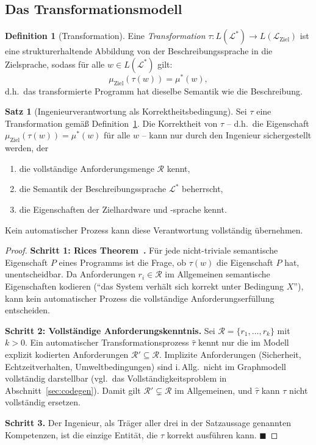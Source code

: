 ﻿\documentclass[a4paper,12pt]{report}
\theoremstyle{definition}
\newtheorem{definition}{Definition}[section]
\newtheorem{satz}{Satz}[section]
\begin{document}
\subsection{Das Transformationsmodell}

\begin{definition}[Transformation]
\label{def:transformation}
Eine \emph{Transformation} $\tau: L(\mathcal{L}^*) \to L(\mathcal{L}_{\text{Ziel}})$
ist eine strukturerhaltende Abbildung von der Beschreibungssprache in die Zielsprache,
sodass für alle $w \in L(\mathcal{L}^*)$ gilt:
\[
  \mu_{\text{Ziel}}(\tau(w)) = \mu^*(w),
\]
d.h.\ das transformierte Programm hat dieselbe Semantik wie die Beschreibung.
\end{definition}

\begin{satz}[Ingenieurverantwortung als Korrektheitsbedingung]
\label{satz:ingverantwortung}
Sei $\tau$ eine Transformation gemäß Definition~\ref{def:transformation}.
Die Korrektheit von $\tau$ -- d.h.\ die Eigenschaft $\mu_{\text{Ziel}}(\tau(w)) = \mu^*(w)$
für alle $w$ -- kann nur durch den Ingenieur sichergestellt werden, der
\begin{enumerate}
  \item die vollständige Anforderungsmenge $\mathcal{R}$ kennt,
  \item die Semantik der Beschreibungssprache $\mathcal{L}^*$ beherrscht,
  \item die Eigenschaften der Zielhardware und -sprache kennt.
\end{enumerate}
Kein automatischer Prozess kann diese Verantwortung vollständig übernehmen.
\end{satz}

\begin{proof}
\textbf{Schritt 1: Rices Theorem~\cite{rice1953}.}
Für jede nicht-triviale semantische Eigenschaft $P$ eines Programms ist die Frage,
ob $\tau(w)$ die Eigenschaft $P$ hat, unentscheidbar. Da Anforderungen
$r_i \in \mathcal{R}$ im Allgemeinen semantische Eigenschaften kodieren
(\enquote{das System verhält sich korrekt unter Bedingung $X$}), kann kein
automatischer Prozess die vollständige Anforderungserfüllung entscheiden.

\textbf{Schritt 2: Vollständige Anforderungskenntnis.}
Sei $\mathcal{R} = \{r_1, \ldots, r_k\}$ mit $k > 0$.
Ein automatischer Transformationsprozess $\hat{\tau}$ kennt nur die im Modell
explizit kodierten Anforderungen $\mathcal{R}' \subseteq \mathcal{R}$.
Implizite Anforderungen (Sicherheit, Echtzeitverhalten, Umweltbedingungen) sind
i.\,Allg.\ nicht im Graphmodell vollständig darstellbar (vgl.\ das Vollständigkeitsproblem
in Abschnitt~\ref{sec:codegen}).
Damit gilt $\mathcal{R}' \subsetneq \mathcal{R}$ im Allgemeinen, und
$\hat{\tau}$ kann $\tau$ nicht vollständig ersetzen.

\textbf{Schritt 3.}
Der Ingenieur, als Träger aller drei in der Satzaussage genannten Kompetenzen,
ist die einzige Entität, die $\tau$ korrekt ausführen kann. $\blacksquare$
\end{proof}
\end{document}
